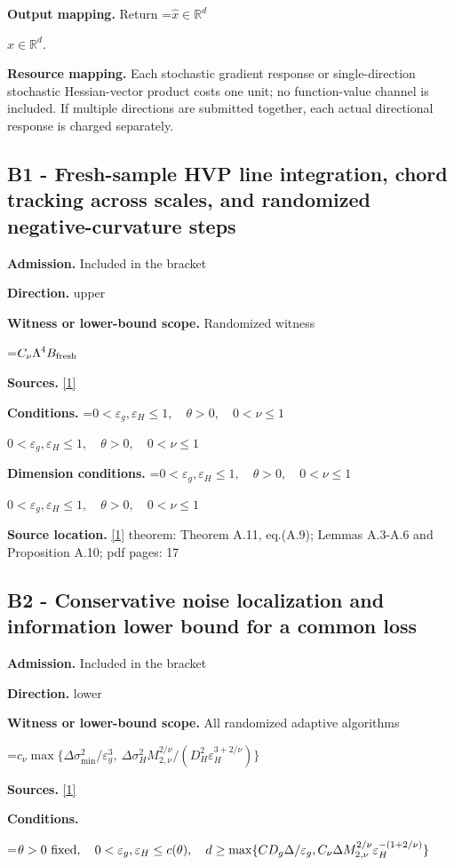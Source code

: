 \documentclass[10pt,a4paper]{article}
\newcommand{\AtlasMath}[1]{\par\begingroup\centering\setbox0=\hbox{$\displaystyle #1$}\ifdim\wd0>1.4\linewidth\typeout{ATLAS WIDE FORMULA: \the\wd0}\fi\ifdim\wd0>\linewidth\resizebox{\linewidth}{!}{\box0}\else\box0\fi\par\endgroup}
\newcommand{\AtlasInlineMath}[1]{\begingroup\setbox0=\hbox{$#1$}\ifdim\wd0>.4\linewidth\endgroup\AtlasMath{#1}\else\endgroup$#1$\fi}
\begin{document}
\textbf{Output mapping.} Return \AtlasInlineMath{\widehat{x}\in \mathbb{R}^d}.

\textbf{Resource mapping.} Each stochastic gradient response or single-direction stochastic Hessian-vector product costs one unit; no function-value channel is included. If multiple directions are submitted together, each actual directional response is charged separately.

\subsection{B1 - Fresh-sample HVP line integration, chord tracking across scales, and randomized negative-curvature steps}
\textbf{Admission.} Included in the bracket

\textbf{Direction.} upper

\textbf{Witness or lower-bound scope.} Randomized witness

\AtlasMath{C_\nu\Lambda^4 B_{\rm fresh}}
\textbf{Sources.} \href{https://arxiv.org/pdf/2609.28238v2}{[1]}

\textbf{Conditions.} \AtlasInlineMath{0<\varepsilon_g,\varepsilon_H\le1,\quad\theta>0,\quad0<\nu\le1}

\textbf{Dimension conditions.} \AtlasInlineMath{0<\varepsilon_g,\varepsilon_H\le1,\quad\theta>0,\quad0<\nu\le1}

\textbf{Source location.} \href{https://arxiv.org/pdf/2609.28238v2}{[1]} theorem: Theorem A.11, eq.(A.9); Lemmas A.3-A.6 and Proposition A.10; pdf pages: 17

\subsection{B2 - Conservative noise localization and information lower bound for a common loss}
\textbf{Admission.} Included in the bracket

\textbf{Direction.} lower

\textbf{Witness or lower-bound scope.} All randomized adaptive algorithms

\AtlasMath{c_\nu\max\{\Delta\sigma_{\min}^2/\varepsilon_g^3,\ \Delta\sigma_H^2M_{2,\nu}^{2/\nu}/(D_H^2\varepsilon_H^{3+2/\nu})\}}
\textbf{Sources.} \href{https://arxiv.org/pdf/2609.28238v2}{[1]}

\textbf{Conditions.} 
\AtlasMath{\theta>0\ {\rm fixed},\quad0<\varepsilon_g,\varepsilon_H\le c(\theta),\quad d\ge\max\{C D_g\Delta/\varepsilon_g,C_\nu\Delta M_{2,\nu}^{2/\nu}\varepsilon_H^{-(1+2/\nu)}\}}
\end{document}

